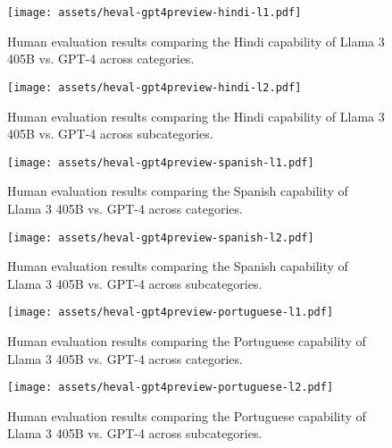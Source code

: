 \begin{figure}
    \centering
    \texttt{[image: assets/heval-gpt4preview-hindi-l1.pdf]}
    \caption{Human evaluation results comparing the Hindi capability of Llama 3 405B vs. GPT-4 across categories.}
    \label{fig:heval-gpt4o-hindi-l1.png}
\end{figure}


\begin{figure}
    \centering
    \texttt{[image: assets/heval-gpt4preview-hindi-l2.pdf]}
    \caption{Human evaluation results comparing the Hindi capability of Llama 3 405B vs. GPT-4 across subcategories.}
    \label{fig:heval-gpt4o-hindi-l2.png}
\end{figure}


\begin{figure}
    \centering
    \texttt{[image: assets/heval-gpt4preview-spanish-l1.pdf]}
    \caption{Human evaluation results comparing the Spanish capability of Llama 3 405B vs. GPT-4 across categories.}
    \label{fig:heval-gpt4o-spanish-l1.png}
\end{figure}


\begin{figure}
    \centering
    \texttt{[image: assets/heval-gpt4preview-spanish-l2.pdf]}
    \caption{Human evaluation results comparing the Spanish capability of Llama 3 405B vs. GPT-4 across subcategories.}
    \label{fig:heval-gpt4o-spanish-l2.png}
\end{figure}

\begin{figure}
    \centering
    \texttt{[image: assets/heval-gpt4preview-portuguese-l1.pdf]}
    \caption{Human evaluation results comparing the Portuguese capability of Llama 3 405B vs. GPT-4 across categories.}
    \label{fig:heval-gpt4o-portuguese-l1.png}
\end{figure}


\begin{figure}
    \centering
    \texttt{[image: assets/heval-gpt4preview-portuguese-l2.pdf]}
    \caption{Human evaluation results comparing the Portuguese capability of Llama 3 405B vs. GPT-4 across subcategories.}
    \label{fig:heval-gpt4o-portuguese-l2.png}
\end{figure}









